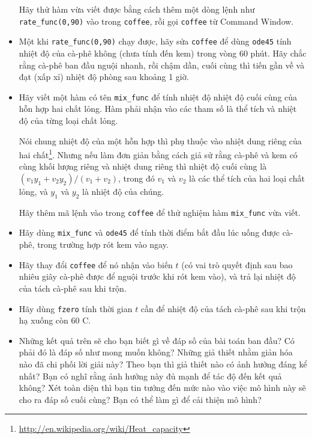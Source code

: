 \documentclass[12pt]{book}
\begin{document}
\begin{ex}
\begin{itemize}
Hãy thử hàm vừa viết được bằng cách thêm một dòng lệnh như 
\verb#rate_func(0,90)# vào trong {\tt coffee}, 
rồi gọi {\tt coffee} từ Command Window.

\item Một khi \verb#rate_func(0,90)# chạy được, hãy sửa
{\tt coffee} để dùng {\tt ode45} tính nhiệt độ của cà-phê không (chưa tính
đến kem) trong vòng 60 phút. Hãy chắc rằng cà-phê ban đầu
nguội nhanh, rồi chậm dần, cuối cùng thì tiến gần về và đạt (xấp xỉ)
nhiệt độ phòng sau khoảng 1 giờ.

\item Hãy viết một hàm có tên \verb#mix_func# để tính nhiệt độ 
nhiệt độ cuối cùng của hỗn hợp hai chất lỏng. Hàm phải nhận vào
các tham số là thể tích và nhiệt độ của từng loại chất lỏng.

Nói chung nhiệt độ của một hỗn hợp thì phụ thuộc vào nhiệt dung
riêng của hai chất\footnote{\url{http://en.wikipedia.org/wiki/Heat_capacity}}.
Nhưng nếu làm đơn giản bằng cách giả sử rằng cà-phê và kem có
cùng khối lượng riêng và nhiệt dung riêng thì nhiệt độ cuối cùng là
$(v_1 y_1 + v_2 y_2) / (v_1 + v_2)$, trong đó $v_1$ và $v_2$ là
các thể tích của hai loại chất lỏng, và $y_1$ và $y_2$ là nhiệt độ của chúng.

Hãy thêm mã lệnh vào trong {\tt coffee} để thử nghiệm hàm 
\verb#mix_func# vừa viết.

\item Hãy dùng \verb#mix_func# và {\tt ode45} để tính thời điểm
bắt đầu lúc uống được cà-phê, trong trường hợp rót kem vào ngay.

\item Hãy thay đổi {\tt coffee} để nó nhận vào biến $t$ (có vai trò
quyết định sau bao nhiêu giây cà-phê được để nguội trước khi rót kem
vào), và trả lại nhiệt độ của tách cà-phê sau khi trộn.

\item Hãy dùng {\tt fzero} tính thời gian $t$ cần để nhiệt độ của
tách cà-phê sau khi trộn hạ xuống còn 60 \degree C.

\item Những kết quả trên sẽ cho bạn biết gì về đáp số của bài toán
ban đầu? Có phải đó là đáp số như mong muốn không? Những
giả thiết nhằm giản hóa nào đã chi phối lời giải này? Theo bạn thì
giả thiết nào có ảnh hưởng đáng kể nhất? Bạn có nghĩ rằng ảnh
hưởng này đủ mạnh để tác độ đến kết quả không? Xét toàn diện
thì bạn tin tưởng đến mức nào vào việc mô hình này sẽ cho ra 
đáp số cuối cùng? Bạn có thể làm gì để cải thiện mô hình?

\end{itemize}

\end{ex}
\end{document}
